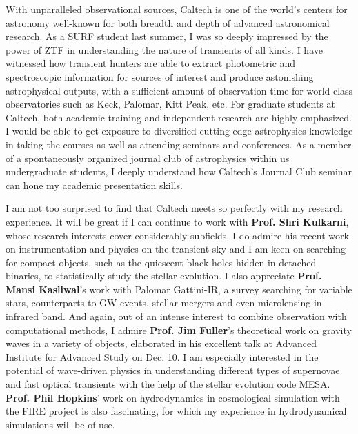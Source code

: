 \documentclass[11pt, a4paper]{awesome-cv} %
\begin{document}
\makecvheader %



\begin{cvletter}




With unparalleled observational sources, Caltech is one of the world’s centers for astronomy well-known for both breadth and depth of advanced astronomical research. As a SURF student last summer, I was so deeply impressed by the power of ZTF in understanding the nature of transients of all kinds. I have witnessed how transient hunters are able to extract photometric and spectroscopic information for sources of interest and produce astonishing astrophysical outputs, with a sufficient amount of observation time for world-class observatories such as Keck, Palomar, Kitt Peak, etc. For graduate students at Caltech, both academic training and independent research are highly emphasized. I would be able to get exposure to diversified cutting-edge astrophysics knowledge in taking the courses as well as attending seminars and conferences. As a member of a spontaneously organized journal club of astrophysics within us undergraduate students, I deeply understand how Caltech's Journal Club seminar can hone my academic presentation skills.

I am not too surprised to find that Caltech meets so perfectly with my research experience. It will be great if I can continue to work with \textbf{Prof. Shri Kulkarni}, whose research interests cover considerably subfields. I do admire his recent work on instrumentation and physics on the transient sky and I am keen on searching for compact objects, such as the quiescent black holes hidden in detached binaries, to statistically study the stellar evolution. I also appreciate \textbf{Prof. Mansi Kasliwal}’s work with Palomar Gattini-IR, a survey searching for variable stars, counterparts to GW events, stellar mergers and even microlensing in infrared band. And again, out of an intense interest to combine observation with computational methods, I admire \textbf{Prof. Jim Fuller}’s theoretical work on gravity waves in a variety of objects, elaborated in his excellent talk at Advanced Institute for Advanced Study on Dec. 10. I am especially interested in the potential of wave-driven physics in understanding different types of supernovae and fast optical transients with the help of the stellar evolution code MESA. \textbf{Prof. Phil Hopkins}’ work on hydrodynamics in cosmological simulation with the FIRE project is also fascinating, for which my experience in hydrodynamical simulations will be of use.



\end{cvletter}
\end{document}
